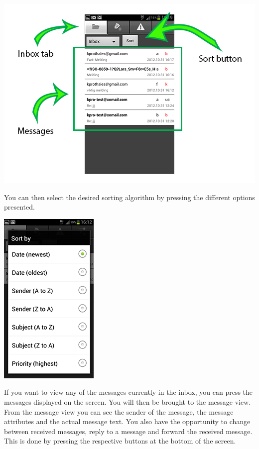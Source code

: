   \begin{center}
    \includegraphics{viewinboxarrows}
  \end{center}
\newpage
You can then select the desired sorting algorithm by pressing the different options presented. 
  \begin{center}
    \includegraphics{SortBy}
  \end{center}

\newpage
If you want to view any of the messages currently in the inbox, you can press the messages displayed on the screen. You will then be brought to the message view. 
\newline 
\newline 
From the message view you can see the sender of the message, the message attributes and the actual message text. You also have the opportunity to change between received messages, reply to a message and forward the received message. This is done by pressing the respective buttons at the bottom of the screen.

